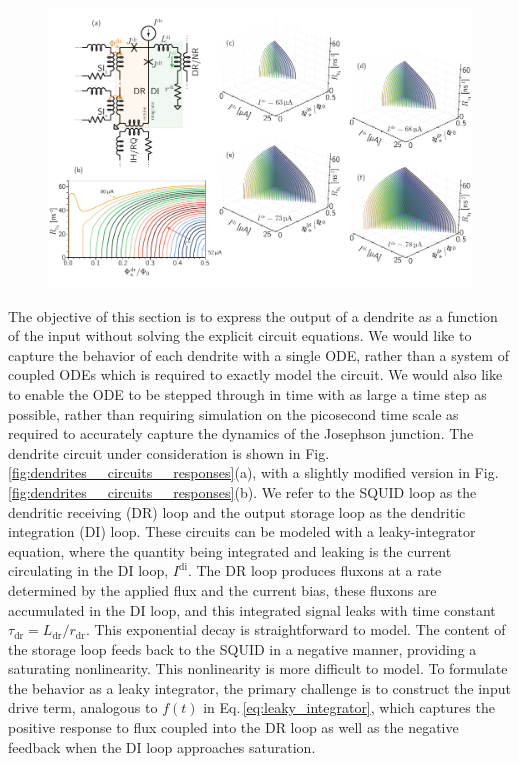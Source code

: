\documentclass[twocolumn]{article}
\begin{document}
\begin{figure}[t]
\includegraphics[width=17.2cm]{figures/_fig__dendrites__circuits__responses__2jj.pdf}
\end{figure}
The objective of this section is to express the output of a dendrite as a function of the input without solving the explicit circuit equations. We would like to capture the behavior of each dendrite with a single ODE, rather than a system of coupled ODEs which is required to exactly model the circuit. We would also like to enable the ODE to be stepped through in time with as large a time step as possible, rather than requiring simulation on the picosecond time scale as required to accurately capture the dynamics of the Josephson junction. The dendrite circuit under consideration is shown in Fig.\,\ref{fig:dendrites__circuits__responses}(a), with a slightly modified version in Fig.\,\ref{fig:dendrites__circuits__responses}(b). We refer to the SQUID loop as the dendritic receiving (DR) loop and the output storage loop as the dendritic integration (DI) loop. These circuits can be modeled with a leaky-integrator equation, where the quantity being integrated and leaking is the current circulating in the DI loop, $I^{\mathrm{di}}$. The DR loop produces fluxons at a rate determined by the applied flux and the current bias, these fluxons are accumulated in the DI loop, and this integrated signal leaks with time constant $\tau_{\mathrm{dr}} = L_{\mathrm{dr}}/r_{\mathrm{dr}}$. This exponential decay is straightforward to model. The content of the storage loop feeds back to the SQUID in a negative manner, providing a saturating nonlinearity. This nonlinearity is more difficult to model. To formulate the behavior as a leaky integrator, the primary challenge is to construct the input drive term, analogous to $f(t)$ in Eq.\,\ref{eq:leaky_integrator}, which captures the positive response to flux coupled into the DR loop as well as the negative feedback when the DI loop approaches saturation.
\end{document}
